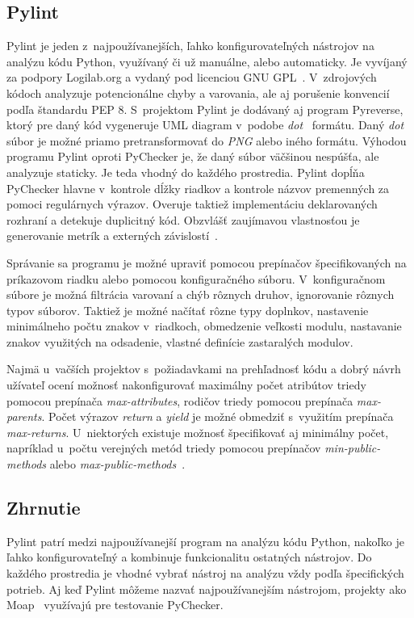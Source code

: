 \documentclass[11pt,oneside,final]{fithesis2}
\begin{document}
\subsection{Pylint}
	Pylint je jeden z~najpoužívanejších, ľahko konfigurovateľných nástrojov na analýzu kódu Python, využívaný či už manuálne, alebo automaticky. Je vyvíjaný za podpory Logilab.org a vydaný pod licenciou GNU GPL~\cite{gnugpl}. V~zdrojových kódoch analyzuje potencionálne chyby a varovania, ale aj porušenie konvencií podľa štandardu PEP 8. S~projektom Pylint je dodávaný aj program Pyreverse, ktorý pre daný kód vygeneruje UML diagram v~podobe \textit{dot}~\cite{dotformat} formátu. Daný \textit{dot} súbor je možné priamo pretransformovať do \textit{PNG} alebo iného formátu. Výhodou programu Pylint oproti PyChecker je, že daný súbor väčšinou nespúšťa, ale analyzuje staticky. Je teda vhodný do každého prostredia. Pylint dopĺňa PyChecker hlavne v~kontrole dĺžky riadkov a kontrole názvov premenných za pomoci regulárnych výrazov. Overuje taktiež implementáciu deklarovaných rozhraní a detekuje duplicitný kód.
    Obzvlášť zaujímavou vlastnosťou je generovanie metrík a externých závislostí~\cite{pylint}.

	Správanie sa programu je možné upraviť pomocou prepínačov špecifikovaných na príkazovom riadku alebo pomocou konfiguračného súboru. V~konfiguračnom súbore je možná filtrácia varovaní a chýb rôznych druhov, ignorovanie rôznych typov súborov. Taktiež je možné načítať rôzne typy doplnkov, nastavenie minimálneho počtu znakov v~riadkoch, obmedzenie veľkosti modulu, nastavanie znakov využitých na odsadenie, vlastné definície zastaralých modulov.
    
    Najmä u~vačších projektov s~požiadavkami na prehľadnosť kódu a dobrý návrh užívateľ ocení možnosť nakonfigurovať maximálny počet atribútov triedy pomocou prepínača \textit{max-attributes}, rodičov triedy pomocou prepínača \textit{max-parents}. Počet výrazov \textit{return} a \textit{yield} je možné obmedziť s~využitím prepínača \textit{max-returns}. U~niektorých existuje možnosť špecifikovať aj minimálny počet, napríklad u~počtu verejných metód triedy pomocou prepínačov \textit{min-public-methods} alebo \textit{max-public-methods}~\cite{pylintfeatures}.
    
\subsection{Zhrnutie}
Pylint patrí medzi najpoužívanejší program na analýzu kódu Python, nakoľko je ľahko konfigurovateľný a kombinuje funkcionalitu ostatných nástrojov. Do každého prostredia je vhodné vybrať nástroj na analýzu vždy podľa špecifických potrieb. Aj keď Pylint môžeme nazvať najpoužívanejším nástrojom, projekty ako Moap~\cite{moap} využívajú pre testovanie PyChecker.
    
\end{document}
